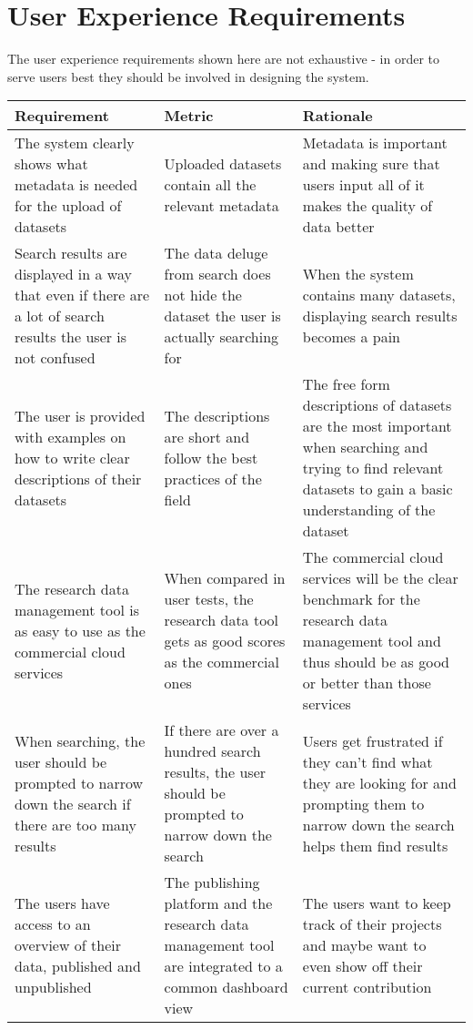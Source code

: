 \pagebreak

\section{User Experience Requirements}

The user experience requirements shown here are not exhaustive - in order to
serve users best they should be involved in designing the system.

\tabcolsep=0.11cm
\begin{tabularx}{\textwidth}{| >{\raggedright}p{3cm} | >{\raggedright}p{3cm} | X |}
    \hline
    \textbf{Requirement} & \textbf{Metric}& \textbf{Rationale} \\
    \hline
    \rowcolor{Gray}
    The system clearly shows what metadata is needed for the upload of datasets   &Uploaded datasets contain all the relevant metadata& Metadata is important and making sure that users input all of it makes the quality of data better\\
    \hline
    Search results are displayed in a way that even if there are a lot of search results the user is not confused&The data deluge from search does not hide the dataset the user is actually searching for &When the system contains many datasets, displaying search results becomes a pain\\
    \hline
    \rowcolor{Gray}
    The user is provided with examples on how to write clear descriptions of their datasets &The descriptions are short and follow the best practices of the field&The free form descriptions of datasets are the most important when searching and trying to find relevant datasets to gain a basic understanding of the dataset\\
    \hline
    The research data management tool is as easy to use as the commercial cloud services &When compared in user tests, the research data tool gets as good scores as the commercial ones & The commercial cloud services will be the clear benchmark for the research data management tool and thus should be as good or better than those services\\
    \hline
    \rowcolor{Gray}
    When searching, the user should be prompted to narrow down the search if there are too many results    &If there are over a hundred search results, the user should be prompted to narrow down the search & Users get frustrated if they can’t find what they are looking for and prompting them to narrow down the search helps them find results\\
    \hline
    The users have access to an overview of their data, published and unpublished& The publishing platform and the research data management tool are integrated to a common dashboard view & The users want to keep track of their projects and maybe want to even show off their current contribution\\

\end{tabularx}
